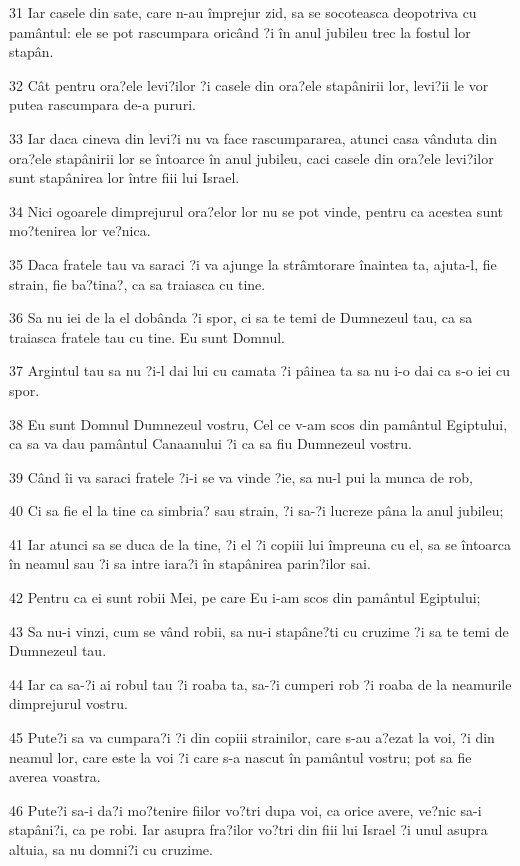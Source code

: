 \par 31 Iar casele din sate, care n-au împrejur zid, sa se socoteasca deopotriva cu pamântul: ele se pot rascumpara oricând ?i în anul jubileu trec la fostul lor stapân.
\par 32 Cât pentru ora?ele levi?ilor ?i casele din ora?ele stapânirii lor, levi?ii le vor putea rascumpara de-a pururi.
\par 33 Iar daca cineva din levi?i nu va face rascumpararea, atunci casa vânduta din ora?ele stapânirii lor se întoarce în anul jubileu, caci casele din ora?ele levi?ilor sunt stapânirea lor între fiii lui Israel.
\par 34 Nici ogoarele dimprejurul ora?elor lor nu se pot vinde, pentru ca acestea sunt mo?tenirea lor ve?nica.
\par 35 Daca fratele tau va saraci ?i va ajunge la strâmtorare înaintea ta, ajuta-l, fie strain, fie ba?tina?, ca sa traiasca cu tine.
\par 36 Sa nu iei de la el dobânda ?i spor, ci sa te temi de Dumnezeul tau, ca sa traiasca fratele tau cu tine. Eu sunt Domnul.
\par 37 Argintul tau sa nu ?i-l dai lui cu camata ?i pâinea ta sa nu i-o dai ca s-o iei cu spor.
\par 38 Eu sunt Domnul Dumnezeul vostru, Cel ce v-am scos din pamântul Egiptului, ca sa va dau pamântul Canaanului ?i ca sa fiu Dumnezeul vostru.
\par 39 Când îi va saraci fratele ?i-i se va vinde ?ie, sa nu-l pui la munca de rob,
\par 40 Ci sa fie el la tine ca simbria? sau strain, ?i sa-?i lucreze pâna la anul jubileu;
\par 41 Iar atunci sa se duca de la tine, ?i el ?i copiii lui împreuna cu el, sa se întoarca în neamul sau ?i sa intre iara?i în stapânirea parin?ilor sai.
\par 42 Pentru ca ei sunt robii Mei, pe care Eu i-am scos din pamântul Egiptului;
\par 43 Sa nu-i vinzi, cum se vând robii, sa nu-i stapâne?ti cu cruzime ?i sa te temi de Dumnezeul tau.
\par 44 Iar ca sa-?i ai robul tau ?i roaba ta, sa-?i cumperi rob ?i roaba de la neamurile dimprejurul vostru.
\par 45 Pute?i sa va cumpara?i ?i din copiii strainilor, care s-au a?ezat la voi, ?i din neamul lor, care este la voi ?i care s-a nascut în pamântul vostru; pot sa fie averea voastra.
\par 46 Pute?i sa-i da?i mo?tenire fiilor vo?tri dupa voi, ca orice avere, ve?nic sa-i stapâni?i, ca pe robi. Iar asupra fra?ilor vo?tri din fiii lui Israel ?i unul asupra altuia, sa nu domni?i cu cruzime.
